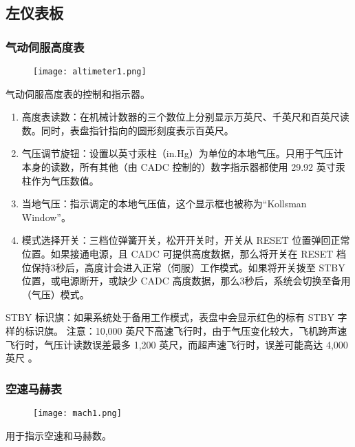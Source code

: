 \subsection{左仪表板}

\subsubsection{气动伺服高度表}
\begin{figure}[htb]
  \center
  \texttt{[image: altimeter1.png]}
\end{figure}
气动伺服高度表的控制和指示器。

\begin{enumerate}
  \item 高度表读数：在机械计数器的三个数位上分别显示万英尺、千英尺和百英尺读数。同时，表盘指针指向的圆形刻度表示百英尺。
  \item 气压调节旋钮：设置以英寸汞柱（in.Hg）为单位的本地气压。只用于气压计本身的读数，所有其他（由 CADC 控制的）数字指示器都使用 29.92 英寸汞柱作为气压数值。
  \item 当地气压：指示调定的本地气压值，这个显示框也被称为“Kollsman Window”。
  \item 模式选择开关：三档位弹簧开关，松开开关时，开关从 RESET 位置弹回正常位置。如果接通电源，且 CADC 可提供高度数据，那么将开关在 RESET 档位保持3秒后，高度计会进入正常（伺服）工作模式。如果将开关拨至 STBY 位置，或电源断开，或缺少 CADC 高度数据，那么3秒后，系统会切换至备用（气压）模式。
\end{enumerate}

STBY 标识旗：如果系统处于备用工作模式，表盘中会显示红色的标有 STBY 字样的标识旗。
注意：10,000 英尺下高速飞行时，由于气压变化较大，飞机跨声速飞行时，气压计读数误差最多 1,200 英尺，而超声速飞行时，误差可能高达 4,000 英尺 。

\subsubsection{空速马赫表}
\begin{figure}[htb]
  \center
  \texttt{[image: mach1.png]}
\end{figure}
用于指示空速和马赫数。

